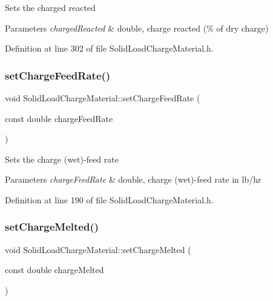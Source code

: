 Sets the charged reacted 
\begin{DoxyParams}{Parameters}
{\em charged\+Reacted} & double, charge reacted (\% of dry charge) \\
\hline
\end{DoxyParams}


Definition at line 302 of file Solid\+Load\+Charge\+Material.\+h.

\mbox{\label{class_solid_load_charge_material_adc50117256b714789f68097437ca658d}} 
\subsubsection{\texorpdfstring{set\+Charge\+Feed\+Rate()}{setChargeFeedRate()}}
{\footnotesize\ttfamily void Solid\+Load\+Charge\+Material\+::set\+Charge\+Feed\+Rate (\begin{DoxyParamCaption}\item[{const double}]{charge\+Feed\+Rate }\end{DoxyParamCaption})\hspace{0.3cm}{\ttfamily [inline]}}

Sets the charge (wet)-\/feed rate 
\begin{DoxyParams}{Parameters}
{\em charge\+Feed\+Rate} & double, charge (wet)-\/feed rate in lb/hr \\
\hline
\end{DoxyParams}


Definition at line 190 of file Solid\+Load\+Charge\+Material.\+h.

\mbox{\label{class_solid_load_charge_material_a9999a2976e8a8662a86cc2a159df5202}} 
\subsubsection{\texorpdfstring{set\+Charge\+Melted()}{setChargeMelted()}}
{\footnotesize\ttfamily void Solid\+Load\+Charge\+Material\+::set\+Charge\+Melted (\begin{DoxyParamCaption}\item[{const double}]{charge\+Melted }\end{DoxyParamCaption})\hspace{0.3cm}{\ttfamily [inline]}}

